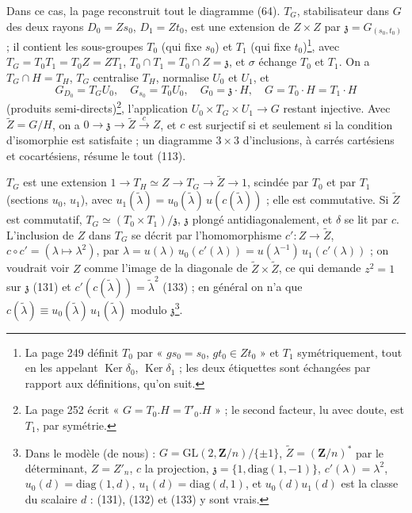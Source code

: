 \documentclass[11pt,a4paper]{article}
\begin{document}
Dans ce cas, la page reconstruit tout le diagramme (64). $T_G$, stabilisateur
dans $G$ des deux rayons $D_0 = Zs_0$, $D_1 = Zt_0$, est une extension de $Z
\times Z$ par $\mathfrak{z} = G_{(s_0, t_0)}$ ; il contient les sous-groupes
$T_0$ (qui fixe $s_0$) et $T_1$ (qui fixe $t_0$)\footnote{La page 249 définit
$T_0$ par « $gs_0 = s_0$, $gt_0 \in Zt_0$ » et $T_1$ symétriquement, tout en les
appelant $\operatorname{Ker}\delta_0$, $\operatorname{Ker}\delta_1$ ; les deux
étiquettes sont échangées par rapport aux définitions, qu'on suit.}, avec $T_G =
T_0 T_1 = T_0 Z = Z T_1$, $T_0 \cap T_1 = T_0 \cap Z = \mathfrak{z}$, et $\sigma$
échange $T_0$ et $T_1$. On a $T_G \cap H = T_H$, $T_G$ centralise $T_H$,
normalise $U_0$ et $U_1$, et
\[
  G_{D_0} = T_G U_0, \quad G_{s_0} = T_0 U_0, \quad G_0 = \mathfrak{z} \cdot H,
  \quad G = T_0 \cdot H = T_1 \cdot H
\]
(produits semi-directs)\footnote{La page 252 écrit « $G = T_0.H = T'_0.H$ » ; le
second facteur, lu avec doute, est $T_1$, par symétrie.}, l'application $U_0
\times T_G \times U_1 \to G$ restant injective. Avec $\widetilde{Z} = G/H$, on a
$0 \to \mathfrak{z} \to \widetilde{Z} \xrightarrow{c} Z$, et $c$ est surjectif
si et seulement si la condition d'isomorphie est satisfaite ; un diagramme $3
\times 3$ d'inclusions, à carrés cartésiens et cocartésiens, résume le tout
(113).

$T_G$ est une extension $1 \to T_H \simeq Z \to T_G \to \widetilde{Z} \to 1$,
scindée par $T_0$ et par $T_1$ (sections $u_0$, $u_1$), avec $u_1(\tilde\lambda)
= u_0(\tilde\lambda)\, u(c(\tilde\lambda))$ ; elle est commutative. Si
$\widetilde{Z}$ est commutatif, $T_G \simeq (T_0 \times T_1)/\mathfrak{z}$,
$\mathfrak{z}$ plongé antidiagonalement, et $\delta$ se lit par $c$. L'inclusion
de $Z$ dans $T_G$ se décrit par l'homomorphisme $c' : Z \to \widetilde{Z}$,
$c \circ c' = (\lambda \mapsto \lambda^2)$, par $\lambda = u(\lambda)\,
u_0(c'(\lambda)) = u(\lambda^{-1})\, u_1(c'(\lambda))$ ; on voudrait voir $Z$
comme l'image de la diagonale de $\widetilde{Z} \times \widetilde{Z}$, ce qui
demande $z^2 = 1$ sur $\mathfrak{z}$ (131) et $c'(c(\tilde\lambda)) =
\tilde\lambda^2$ (133) ; en général on n'a que $c(\tilde\lambda) \equiv
u_0(\tilde\lambda)\, u_1(\tilde\lambda)$ modulo $\mathfrak{z}$\footnote{Dans le
modèle (de nous) : $G = \mathrm{GL}(2, \mathbf{Z}/n)/\{\pm 1\}$, $\widetilde{Z} =
(\mathbf{Z}/n)^{*}$ par le déterminant, $Z = Z'_n$, $c$ la projection,
$\mathfrak{z} = \{1, \mathrm{diag}(1, -1)\}$, $c'(\lambda) = \lambda^2$,
$u_0(d) = \mathrm{diag}(1, d)$, $u_1(d) = \mathrm{diag}(d, 1)$, et
$u_0(d)u_1(d)$ est la classe du scalaire $d$ : (131), (132) et (133) y sont
vrais.}.
\end{document}
